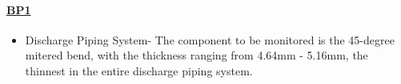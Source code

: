 
\paragraph{\underline{BP1}}
\begin{itemize}

\item Discharge Piping System- The component to be monitored is the 45-degree mitered bend, with the thickness ranging from 4.64mm - 5.16mm, the thinnest in the entire discharge piping system.

\end{itemize}

